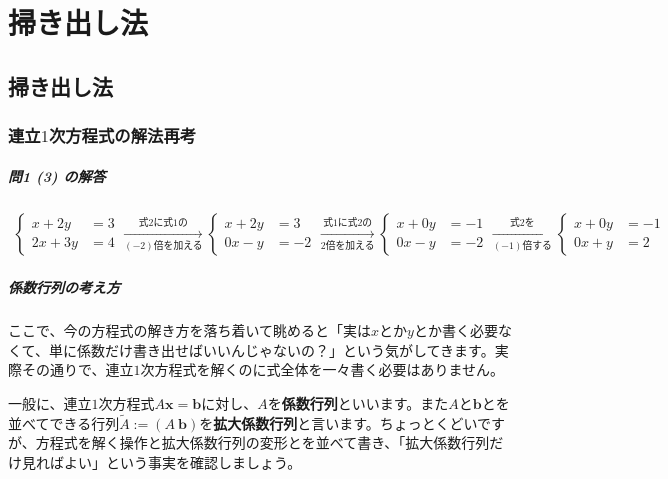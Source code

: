 \chapter{掃き出し法}


\section{掃き出し法}

\subsection{連立$1$次方程式の解法再考}

\paragraph{問1 (3) の解答} %

\begin{align*}
\begin{cases}
x + 2y &= 3 \\
2x + 3y &= 4
\end{cases}
\xrightarrow[\text{$(-2)$倍を加える}]{\text{式2に式1の}}
\begin{cases}
x + 2y &= 3 \\
0x - y &= -2
\end{cases}
\xrightarrow[\text{$2$倍を加える}]{\text{式1に式2の}}
\begin{cases}
x + 0y &= -1 \\
0x - y &= -2
\end{cases}
\xrightarrow[\text{$(-1)$倍する}]{\text{式2を}}
\begin{cases}
x + 0y &= -1 \\
0x + y &= 2
\end{cases}
\end{align*}

\paragraph{係数行列の考え方}

ここで、今の方程式の解き方を落ち着いて眺めると「実は$x$とか$y$とか書く必要なくて、単に係数だけ書き出せばいいんじゃないの？」という気がしてきます。実際その通りで、連立$1$次方程式を解くのに式全体を一々書く必要はありません。

一般に、連立$1$次方程式$A\bm{x} = \bm{b}$に対し、$A$を\textbf{係数行列}といいます。また$A$と$\bm{b}$とを並べてできる行列$\tilde{A} := (A\ \bm{b})$を\textbf{拡大係数行列}と言います。ちょっとくどいですが、方程式を解く操作と拡大係数行列の変形とを並べて書き、「拡大係数行列だけ見ればよい」という事実を確認しましょう。

